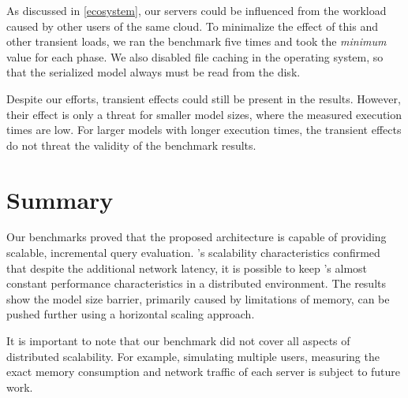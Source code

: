 As discussed in \autoref{ecosystem}, our servers could be influenced from the workload caused by other users of the same cloud. To minimalize the effect of this and other transient loads, we ran the benchmark five times and took the \emph{minimum} value for each phase. We also disabled file caching in the operating system, so that the serialized model always must be read from the disk.

Despite our efforts, transient effects could still be present in the results. However, their effect is only a threat for smaller model sizes, where the measured execution times are low. For larger models with longer execution times, the transient effects do not threat the validity of the benchmark results.


\section{Summary}

Our benchmarks proved that the proposed architecture is capable of providing scalable, incremental query evaluation.
\iqd{}'s scalability characteristics confirmed that despite the additional network latency, it is possible to keep \eiq{}'s almost constant performance characteristics in a distributed environment. The results show the model size barrier, primarily caused by limitations of memory, 
can be pushed further using a horizontal scaling approach.

It is important to note that our benchmark did not cover all aspects of distributed scalability. For example, simulating multiple users, measuring the exact memory consumption and network traffic of each server is subject to future work.


